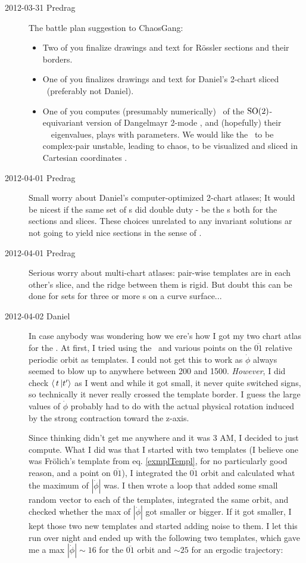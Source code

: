 \begin{description}
\item[2012-03-31 Predrag] The battle plan suggestion to ChaosGang:
\begin{itemize}
  \item
        Two of you finalize drawings and text for R\"ossler sections and
        their borders.
  \item
        One of you finalizes drawings and text for Daniel's 2-chart
        sliced \cLe\ (preferably not Daniel).
  \item
        One of you computes (presumably numerically) \reqva\ of the
        $\textrm{SO}(2)$-equivariant version of Dangelmayr 2-mode
        , and (hopefully) their \stabmat\ \Mvar\
        eigenvalues, plays with parameters. We would like the \reqva\ to
        be complex-pair unstable, leading to chaos, to be visualized and
        sliced in Cartesian coordinates \refeq{eq:AGH}.
\end{itemize}

\item[2012-04-01 Predrag] Small worry about Daniel's computer-optimized
2-chart atlases; It would be nicest if the same set of {\template s} did
double duty - be the {\template s} both for the sections and slices.
These choices unrelated to any invariant solutions ar not going to yield
nice sections in the sense of \reffig{fig:A29PoincBad}.

\item[2012-04-01 Predrag] Serious worry about multi-chart atlases:
pair-wise templates are in each other's slice, and the ridge between them
is rigid. But doubt this can be done for sets for three or more
{\template s} on a curve surface...

\item[2012-04-02 Daniel]
In case anybody was wondering how we
ere's how I got my two chart atlas for the
\cLe. At first, I tried using the
\reqv\ and various points on the $\overline{01}$ relative
periodic orbit as templates. I could not get this to work as $\dot{\phi}$
always seemed to blow up to anywhere between 200 and 1500.
\emph{However}, I did check $\braket{\,t\,}{\sliceTan{}{}}$ as I went and
while it got small, it never quite switched signs, so technically it
never really crossed the template border. I guess the large values of
$\dot{\phi}$ probably had to do with the actual physical rotation induced
by the strong contraction toward the z-axis.

Since thinking didn't get me anywhere and it was 3 AM, I decided to just
compute. What I did was that I started with two templates (I believe one
was Fr\"olich's template from eq. \ref{exmplTempl}, for no particularly
good reason, and a point on $\overline{01}$), I integrated the
$\overline{01}$ orbit and calculated what the maximum of $|\dot{\phi}|$
was. I then wrote a loop that added some small random vector to each of
the templates, integrated the same orbit, and checked whether the max of
$|\dot{\phi}|$ got smaller or bigger. If it got smaller, I kept those two
new templates and started adding noise to them. I let this run over night
and ended up with the following two templates, which gave me a max
$|\dot{\phi}| \sim 16$ for the $\overline{01}$ orbit and $\sim 25$ for an
ergodic trajectory:


\end{description}
